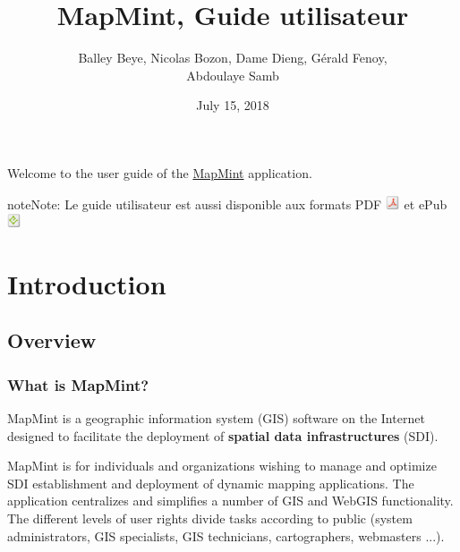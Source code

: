 \documentclass[letterpaper,10pt,english]{sphinxmanual}
\title{MapMint, Guide utilisateur}
\date{July 15, 2018}
\author{Balley Beye, Nicolas Bozon, Dame Dieng, Gérald Fenoy, \\Abdoulaye Samb}
\begin{document}
\maketitle
\tableofcontents
{}\label{index::doc}


Welcome to the user guide of the \href{http://mapmint.com}{MapMint} application.

\begin{notice}{note}{Note:}
Le guide utilisateur est aussi disponible aux formats
PDF \includegraphics{pdf.png}  et ePub \includegraphics{epub.png}
\end{notice}


\chapter{Introduction}
\label{introduction/index:table-des-matieres}\label{introduction/index:home}\label{introduction/index::doc}\label{introduction/index:dashboard}\label{introduction/index:introduction}

\section{Overview}
\label{introduction/introduction:generalites}\label{introduction/introduction::doc}\label{introduction/introduction:userguidegeneral}

\subsection{What is MapMint?}
\label{introduction/introduction:quest-ce-que-mapmint}
MapMint is a geographic information system (GIS) software on the Internet designed to facilitate the deployment of  \textbf{spatial data infrastructures} (SDI).

MapMint is for individuals and organizations wishing to manage and optimize SDI establishment and deployment of dynamic mapping applications. The application centralizes and simplifies a number of GIS and WebGIS functionality. The different levels of user rights divide tasks according to public (system administrators, GIS specialists, GIS technicians, cartographers, webmasters ...).
\end{document}

